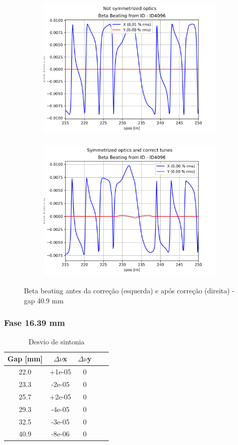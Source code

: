 \documentclass[a4paper,12pt]{article}
\begin{document}
\begin{figure}[H]
\begin{subfigure}{0.5\textwidth}
\includegraphics[width=0.9\linewidth, height=7cm]{figs/phase-16 gap40 uncorrected-optics.png} 
\label{fig:subim1-1640}
\end{subfigure}
\begin{subfigure}{0.5\textwidth}
\includegraphics[width=0.9\linewidth, height=7cm]{figs/phase-16 gap40 corrected-optics-tunes.png}
\label{fig:subim2-1640}
\end{subfigure}
\caption{Beta beating antes da correção (esquerda) e após correção (direita) - gap 40.9 mm}
\label{fig:bb-16_40}
\end{figure}

\subsubsection{Fase 16.39 mm}

\begin{table}[H]
\centering
\caption{Desvio de sintonia}
\begin{tabular}{|c|c|c|c|c|}
\hline
Gap {[}mm{]} & $\Delta \nu$x & $\Delta \nu$y\\ \hline
22.0 & +1e-05 & 0\\ \hline
23.3 & -2e-05 & 0\\ \hline
25.7 & +2e-05 & 0\\ \hline
29.3 & -4e-05 & 0\\ \hline
32.5 & -3e-05 & 0\\ \hline
40.9 & -8e-06 & 0\\ \hline
\end{tabular}
\label{tab:coropt16}
\end{table}
\end{document}
